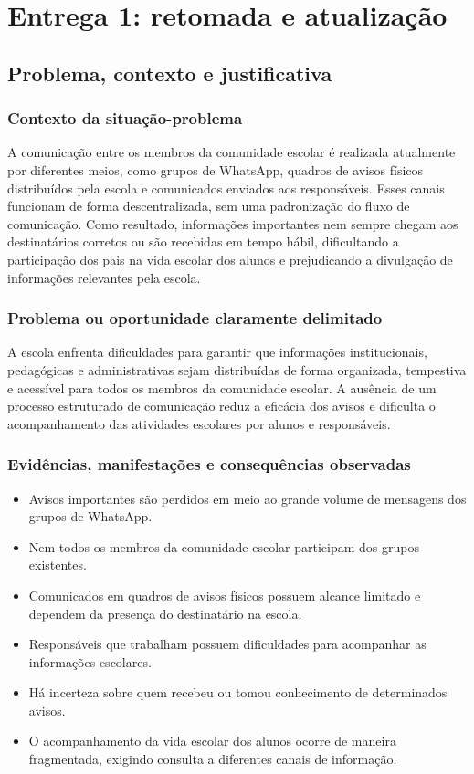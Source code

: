 \section{Entrega 1: retomada e atualização}
\subsection{Problema, contexto e justificativa}
\subsubsection{Contexto da situação-problema}
A comunicação entre os membros da comunidade escolar é realizada atualmente por diferentes meios, como grupos de WhatsApp, quadros de avisos físicos distribuídos pela escola e comunicados enviados aos responsáveis. Esses canais funcionam de forma descentralizada, sem uma padronização do fluxo de comunicação. Como resultado, informações importantes nem sempre chegam aos destinatários corretos ou são recebidas em tempo hábil, dificultando a participação dos pais na vida escolar dos alunos e prejudicando a divulgação de informações relevantes pela escola.

\subsubsection{Problema ou oportunidade claramente delimitado}
A escola enfrenta dificuldades para garantir que informações institucionais, pedagógicas e administrativas sejam distribuídas de forma organizada, tempestiva e acessível para todos os membros da comunidade escolar. A ausência de um processo estruturado de comunicação reduz a eficácia dos avisos e dificulta o acompanhamento das atividades escolares por alunos e responsáveis.

\subsubsection{Evidências, manifestações e consequências observadas}
\begin{itemize}
\item Avisos importantes são perdidos em meio ao grande volume de mensagens dos grupos de WhatsApp.
\item Nem todos os membros da comunidade escolar participam dos grupos existentes.
\item Comunicados em quadros de avisos físicos possuem alcance limitado e dependem da presença do destinatário na escola.
\item Responsáveis que trabalham possuem dificuldades para acompanhar as informações escolares.
\item Há incerteza sobre quem recebeu ou tomou conhecimento de determinados avisos.
\item O acompanhamento da vida escolar dos alunos ocorre de maneira fragmentada, exigindo consulta a diferentes canais de informação.
\end{itemize}

